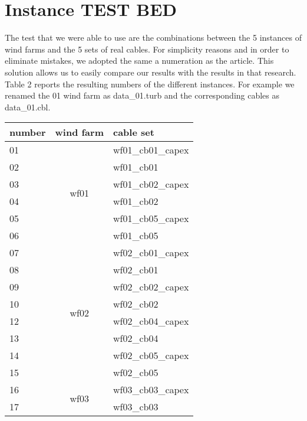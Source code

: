 \section{Instance TEST BED}
The test that we were able to use are the combinations between the 5 instances of wind farms and the 5 sets of real cables. For simplicity reasons and in order to eliminate mistakes, we adopted the same a numeration as the \cite{wfcp} article. This solution allows us to easily compare our results with the results in that research. 
Table 2 reports the resulting numbers of the different instances. For example we renamed the 01 wind farm as data\_01.turb and the corresponding cables as data\_01.cbl. 

\begin{table}[!htbp]\label{tab:testBed}
\center
\begin{tabular}{lcl}
\hline
number & \multicolumn{1}{l}{wind farm} & cable set         \\ \hline
01     & \multirow{6}{*}{wf01}         & wf01\_cb01\_capex \\
02     &                               & wf01\_cb01        \\
03     &                               & wf01\_cb02\_capex \\
04     &                               & wf01\_cb02        \\
05     &                               & wf01\_cb05\_capex \\
06     &                               & wf01\_cb05        \\ \hline
07     & \multirow{8}{*}{wf02}         & wf02\_cb01\_capex \\
08     &                               & wf02\_cb01        \\
09     &                               & wf02\_cb02\_capex \\
10     &                               & wf02\_cb02        \\
12     &                               & wf02\_cb04\_capex \\
13     &                               & wf02\_cb04        \\
14     &                               & wf02\_cb05\_capex \\
15     &                               & wf02\_cb05        \\ \hline
16     & \multirow{4}{*}{wf03}         & wf03\_cb03\_capex \\
17     &                               & wf03\_cb03        \\

\end{tabular}
\end{table}
